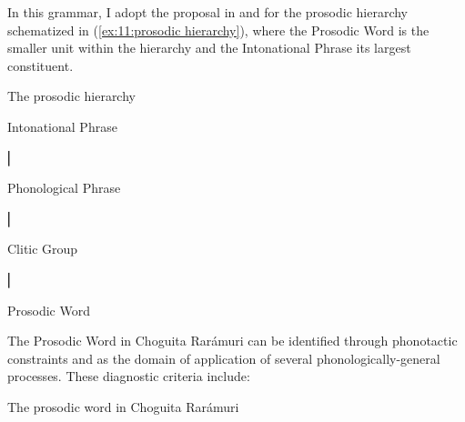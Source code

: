 In this grammar, I adopt the proposal in \citet{selkirk1980prosodic, selkirk1996prosodic, nespor1986prosodic} and \citet{hayes1989prosodic} for the prosodic hierarchy schematized in (\ref{ex:11:prosodic hierarchy}), where the Prosodic Word is the smaller unit within the hierarchy and the Intonational Phrase its largest constituent.

\ea\label{ex:11:prosodic hierarchy}
{The prosodic hierarchy}\mbox{}

   Intonational Phrase

     \hspace*{1cm}⎜

   Phonological Phrase

     \hspace*{1cm}⎜

   Clitic Group

     \hspace*{1cm}⎜

   Prosodic Word
   \z

The Prosodic Word in Choguita Rarámuri can be identified through phonotactic constraints and as the domain of application of several phonologically-general processes. These diagnostic criteria include:

\ea\label{ex: prosodic word}
 {The prosodic word in Choguita Rarámuri}
    				\z
   				\z

